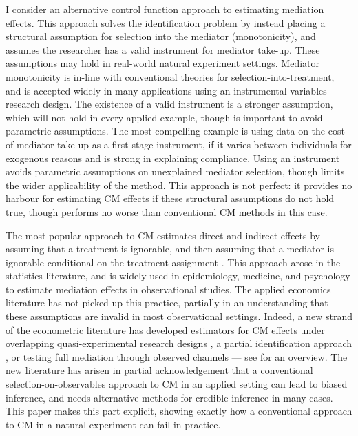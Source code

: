 I consider an alternative control function approach to estimating mediation effects.
This approach solves the identification problem by instead placing a structural assumption for selection into the mediator (monotonicity), and assumes the researcher has a valid instrument for mediator take-up.
These assumptions may hold in real-world natural experiment settings.
Mediator monotonicity is in-line with conventional theories for selection-into-treatment, and is accepted widely in many applications using an instrumental variables research design.
The existence of a valid instrument is a stronger assumption, which will not hold in every applied example, though is important to avoid parametric assumptions. %
The most compelling example is using data on the cost of mediator take-up as a first-stage instrument, if it varies between individuals for exogenous reasons and is strong in explaining compliance.
Using an instrument avoids parametric assumptions on unexplained mediator selection, though limits the wider applicability of the method.
This approach is not perfect: it provides no harbour for estimating CM effects if these structural assumptions do not hold true, though performs no worse than conventional CM methods in this case.

The most popular approach to CM estimates direct and indirect effects by assuming that a treatment is ignorable, and then assuming that a mediator is ignorable conditional on the treatment assignment \citep{imai2010identification}.
This approach arose in the statistics literature, and is widely used in epidemiology, medicine, and psychology to estimate mediation effects in observational studies.
The applied economics literature has not picked up this practice, partially in an understanding that these assumptions are invalid in most observational settings.
Indeed, a new strand of the econometric literature has developed estimators for CM effects under overlapping quasi-experimental research designs \citep{deuchert2019direct,frolich2017direct}, a partial identification approach \citep{flores2009identification}, or testing full mediation through observed channels \citep{kwon2024testing} --- see \cite{huber2019review} for an overview.
The new literature has arisen in partial acknowledgement that a conventional selection-on-observables approach to CM in an applied setting can lead to biased inference, and needs alternative methods for credible inference in many cases.
This paper makes this part explicit, showing exactly how a conventional approach to CM in a natural experiment can fail in practice.

